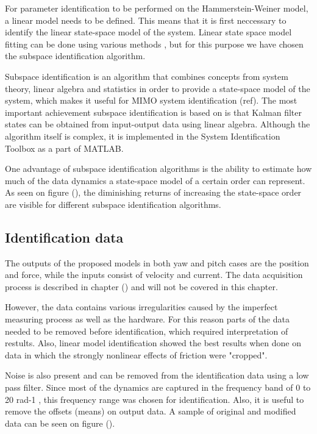 For parameter identification to be performed on the Hammerstein-Weiner model, a linear model needs to be defined.
This means that it is first neccessary to identify the linear state-space model of the system.
Linear state space model fitting can be done using various methods , but for this purpose we have chosen the subspace identification algorithm.

Subspace identification is an algorithm that combines concepts from system theory, linear algebra and statistics in order to provide a state-space model of the system, which makes it useful for MIMO system identification (ref). 
The most important achievement subspace identification is based on is that Kalman filter states can be obtained from input-output data using linear algebra.
Although the algorithm itself is complex, it is implemented in the System Identification Toolbox as a part of MATLAB.

One advantage of subspace identification algorithms is the ability to estimate how much of the data dynamics a state-space model of a certain order can represent. 
As seen on figure (), the diminishing returns of increasing the state-space order are visible for different subspace identification algorithms.


\subsection{Identification data}
The outputs of the proposed models in both yaw and pitch cases are the position and force, while the inputs consist of velocity and current.
The data acquisition process is described in chapter () and will not be covered in this chapter.

However, the data contains various irregularities caused by the imperfect measuring process as well as the hardware.
For this reason parts of the data needed to be removed before identification, which required interpretation of restults.
Also, linear model identification showed the best results when done on data in which the strongly nonlinear effects of friction were "cropped".


Noise is also present and can be removed from the identification data using a low pass filter.
Since most of the dynamics are captured in the frequency band of 0 to 20 rad-1 , this frequency range was chosen for identification.
Also, it is useful to remove the offsets (means) on output data.
A sample of original and modified data can be seen on figure ().
%


